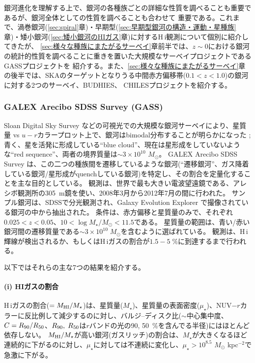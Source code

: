 銀河進化を理解する上で、銀河の各種族ごとの詳細な性質を調べることも重要であるが、銀河全体としての性質を調べることも合わせて
重要である。これまで、渦巻銀河(\ref{sec:spiral}章)・早期型(\ref{sec:早期型銀河の構造・運動・星種族}章)・矮小銀河(\ref{sec:矮小銀河のHIガス}章)に対するH\,{\sc i}観測について個別に紹介してきたが、
\ref{sec:様々な種族にまたがるサーベイ}章前半では、$z \sim 0$における銀河の統計的性質を調べることに重きを置いた大規模なサーベイプロジェクトであるGASSプロジェクトを
紹介する。また、\ref{sec:様々な種族にまたがるサーベイ}章の後半では、SKAのターゲットとなりうる中間赤方偏移帯($0.1<z<1.0$)の銀河に対する2つのサーベイ、BUDHIES、
CHILESプロジェクトを紹介する。

\subsubsection{GALEX Arecibo SDSS Survey (GASS)}

Sloan Digital Sky Survey \citep[SDSS,][]{2000AJ....120.1579Y}などの可視光での大規模な銀河サーベイにより、星質量 vs $u-r$カラープロット上で、銀河はbimodal分布することが明らかになった \citep[e.g.,][]{2001AJ....122.1861S}; 
青く、星を活発に形成している``blue cloud''、現在は星形成をしていないような``red sequence''、両者の境界質量は$\sim3\times10^{10}$ $M_\odot$。
GALEX Arecibo SDSS Survey \citep[GASS,][]{2010MNRAS.403..683C}は、この二つの種族間を遷移しているような銀河(``遷移銀河''、ガス降着している銀河/星形成がquenchしている銀河)を特定し、その割合を定量化することを主な目的としている。
観測は、世界で最も大きい電波望遠鏡である、アレシボ観測所の305~m鏡を使い、2008年3月から2012年7月の間に行われた。
サンプル銀河は、SDSSで分光観測され、Galaxy Evolution Explorer \citep[GALEX,][]{2005ApJ...619L...1M}で撮像されている銀河の中から抽出された。
条件は、赤方偏移と星質量のみで、それぞれ$0.025<z<0.05$、$10<\log{M_\star/M_\odot}<11.5$である。
星質量の範囲は、青い/赤い銀河間の遷移質量である$\sim3\times10^{10}\; M_\odot$を含むように選ばれている。
観測は、H\,{\sc i}輝線が検出されるか、もしくはH\,{\sc i}ガスの割合が$1.5-5\; \%$に到達するまで行われる。

以下ではそれらの主な7つの結果を紹介する。

\paragraph{(i) HIガスの割合 \citep{2010MNRAS.403..683C,2012MNRAS.420.1959C}}

H\,{\sc i}ガスの割合($=M_{\rm HI}/M_\star$)は、星質量($M_\star$)、星質量の表面密度($\mu_\star$)、NUV$-r$カラーに反比例して減少するのに対し、バルジ--ディスク比($\sim$中心集中度、$C=R_{\rm 90}/R_{\rm 50}$、$R_{\rm 90}, \; R_{\rm 50}$は$r$バンドの光の90, 50~\%を含んでる半径)にはほとんど依存しない。
$M_{\rm HI}/M_\star$が高い銀河(ガスリッチ)の割合は、$M_\star$が大きくなるほど連続的に下がるのに対し、$\mu_\star$に対しては不連続に変化し、$\mu_\star>10^{8.5}$ $M_\odot$ kpc$^{-2}$で急激に下がる。

